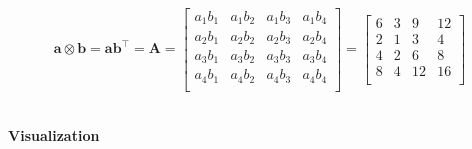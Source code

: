 \documentclass{article}
\begin{document}
$$
{\displaystyle 
    \mathbf {a} \otimes \mathbf {b} =\mathbf{a}\mathbf{b^{\top}} =\mathbf {A} =
    {\begin{bmatrix} 
        a_{1}b_{1} & a_{1}b_{2} & a_{1}b_{3} & a_{1}b_{4} \\ 
        a_{2}b_{1} & a_{2}b_{2} & a_{2}b_{3} & a_{2}b_{4} \\
        a_{3}b_{1} & a_{3}b_{2} & a_{3}b_{3} & a_{3}b_{4} \\
        a_{4}b_{1} & a_{4}b_{2} & a_{4}b_{3} & a_{4}b_{4} \\
    \end{bmatrix}} = 
    {\begin{bmatrix} 
        6 & 3 & 9 & 12 \\
        2 & 1 & 3 & 4 \\
        4 & 2 & 6 & 8 \\
        8 & 4 & 12 & 16 \\
    \end{bmatrix}}
}
$$ 
\\ 
\begin{center}
    \textbf{\large Visualization}
\end{center} 
\end{document}
